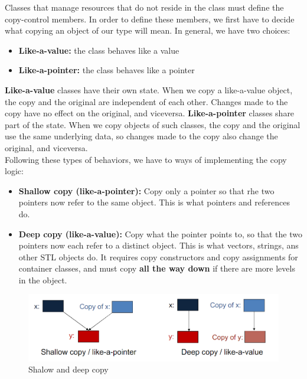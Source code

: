 Classes that manage resources that do not reside in the class must define the copy-control
members. In order to define these members, we first have to decide what copying an object
of our type will mean. In general, we have two choices:

\begin{itemize}
    \item \textbf{Like-a-value:} the class behaves like a value
    \item \textbf{Like-a-pointer:} the class behaves like a pointer
\end{itemize}

\textbf{Like-a-value} classes have their own state. When we copy a like-a-value object, the copy
and the original are independent of each other. Changes made to the copy have no effect on the
original, and viceversa. \textbf{Like-a-pointer} classes share part of the state. When we copy 
objects of such classes, the copy and the original use the same underlying data, so changes made
to the copy also change the original, and viceversa.\\

Following these types of behaviors, we have to ways of implementing the copy logic:

\begin{itemize}
    \item \textbf{Shallow copy (like-a-pointer):} Copy only a pointer so that rhe two pointers
    now refer to the same object. This is what pointers and references do.

    \item \textbf{Deep copy (like-a-value):} Copy what the pointer points to, so that the two
    pointers now each refer to a distinct object. This is what vectors, strings, ans other STL
    objects do. It requires copy constructors and copy assignments for container classes, and 
    must copy \textbf{all the way down} if there are more levels in the object.
\end{itemize}

\begin{figure}[H]
    \centering
    \includegraphics[width=14cm]{figures/shallow-and-deep.png}
    \caption{Shalow and deep copy}
    \label{fig:shallow-deep}
\end{figure}


